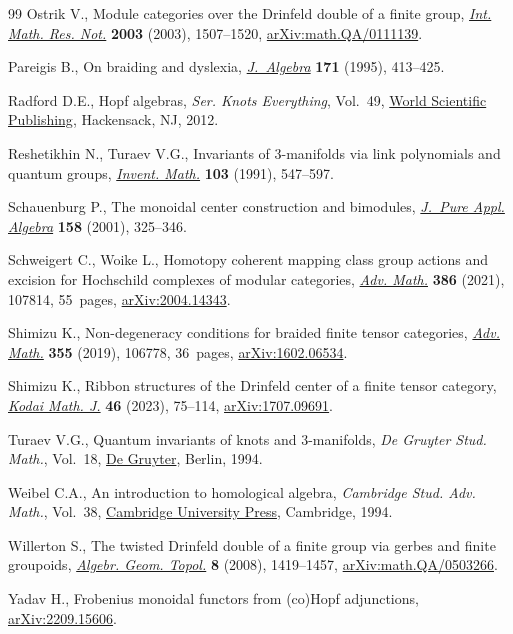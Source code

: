 \documentclass[10pt,a4paper]{amsart}
\numberwithin{equation}{section}
\begin{document}
\begin{thebibliography}{99}
Ostrik V., Module categories over the {D}rinfeld double of a finite group,
 \href{https://doi.org/10.1155/S1073792803205079}{\textit{Int. Math. Res. Not.}} \textbf{2003} (2003), 1507--1520,
 \href{https://arxiv.org/abs/math.QA/0111139}{arXiv:math.QA/0111139}.

Pareigis B., On braiding and dyslexia, \href{https://doi.org/10.1006/jabr.1995.1019}{\textit{J.~Algebra}} \textbf{171} (1995),
 413--425.

Radford D.E., Hopf algebras, \textit{Ser. Knots Everything}, Vol.~49, \href{https://doi.org/10.1142/8055}{World
 Scientific Publishing}, Hackensack, NJ, 2012.

Reshetikhin N., Turaev V.G., Invariants of {$3$}-manifolds via link polynomials
 and quantum groups, \href{https://doi.org/10.1007/BF01239527}{\textit{Invent. Math.}} \textbf{103} (1991), 547--597.

Schauenburg P., The monoidal center construction and bimodules, \href{https://doi.org/10.1016/S0022-4049(00)00040-2}{\textit{J.~Pure
 Appl. Algebra}} \textbf{158} (2001), 325--346.

Schweigert C., Woike L., Homotopy coherent mapping class group actions and
 excision for {H}ochschild complexes of modular categories, \href{https://doi.org/10.1016/j.aim.2021.107814}{\textit{Adv.
 Math.}} \textbf{386} (2021), 107814, 55~pages, \href{https://arxiv.org/abs/2004.14343}{arXiv:2004.14343}.

Shimizu K., Non-degeneracy conditions for braided finite tensor categories,
 \href{https://doi.org/10.1016/j.aim.2019.106778}{\textit{Adv. Math.}} \textbf{355} (2019), 106778, 36~pages,
 \href{https://arxiv.org/abs/1602.06534}{arXiv:1602.06534}.

Shimizu K., Ribbon structures of the {D}rinfeld center of a finite tensor
 category, \href{https://doi.org/10.2996/kmj46106}{\textit{Kodai Math. J.}} \textbf{46} (2023), 75--114,
 \href{https://arxiv.org/abs/1707.09691}{arXiv:1707.09691}.

Turaev V.G., Quantum invariants of knots and 3-manifolds, \textit{{D}e Gruyter
 Stud. Math.}, Vol.~18, \href{https://doi.org/10.1515/9783110435221}{{D}e Gruyter}, Berlin, 1994.

Weibel C.A., An introduction to homological algebra, \textit{Cambridge Stud.
 Adv. Math.}, Vol.~38, \href{https://doi.org/10.1017/CBO9781139644136}{Cambridge University Press}, Cambridge, 1994.

Willerton S., The twisted {D}rinfeld double of a finite group via gerbes and
 finite groupoids, \href{https://doi.org/10.2140/agt.2008.8.1419}{\textit{Algebr. Geom. Topol.}} \textbf{8} (2008),
 1419--1457, \href{https://arxiv.org/abs/math.QA/0503266}{arXiv:math.QA/0503266}.

Yadav H., Frobenius monoidal functors from (co){H}opf adjunctions,
 \href{https://arxiv.org/abs/2209.15606}{arXiv:2209.15606}.

\end{thebibliography}
\end{document}
